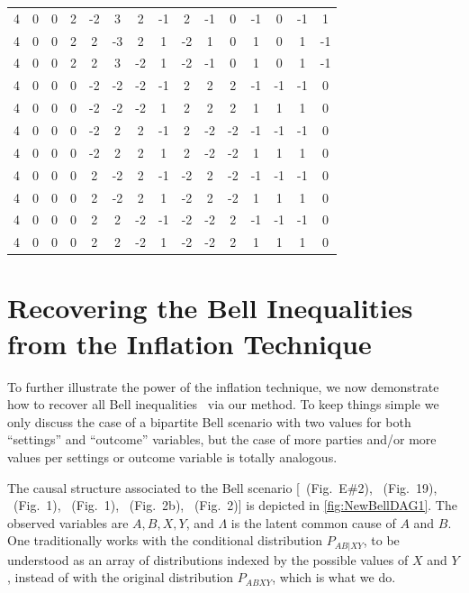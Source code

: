 \documentclass[aps,english,10pt,superscriptaddress,onecolumn,twoside,longbibliography,pra,floatfix,fleqn,nofootinbib]{revtex4-1}
\theoremstyle{definition}
\begin{document}
\begin{table}[hb]
{\begin{tabular}{c@{\hspace{1em}}ccc@{\hspace{1em}}ccc@{\hspace{1em}}c@{\hspace{1em}}ccc@{\hspace{1em}}ccc@{\hspace{1em}}c}
 4 & 0 & 0 & 2 & -2 & 3 & 2 & -1 & 2 & -1 & 0 & -1 & 0 & -1 & 1 \\
 4 & 0 & 0 & 2 & 2 & -3 & 2 & 1 & -2 & 1 & 0 & 1 & 0 & 1 & -1 \\
 4 & 0 & 0 & 2 & 2 & 3 & -2 & 1 & -2 & -1 & 0 & 1 & 0 & 1 & -1 \\
 4 & 0 & 0 & 0 & -2 & -2 & -2 & -1 & 2 & 2 & 2 & -1 & -1 & -1 & 0 \\
 4 & 0 & 0 & 0 & -2 & -2 & -2 & 1 & 2 & 2 & 2 & 1 & 1 & 1 & 0 \\
 4 & 0 & 0 & 0 & -2 & 2 & 2 & -1 & 2 & -2 & -2 & -1 & -1 & -1 & 0 \\
 4 & 0 & 0 & 0 & -2 & 2 & 2 & 1 & 2 & -2 & -2 & 1 & 1 & 1 & 0 \\
 4 & 0 & 0 & 0 & 2 & -2 & 2 & -1 & -2 & 2 & -2 & -1 & -1 & -1 & 0 \\
 4 & 0 & 0 & 0 & 2 & -2 & 2 & 1 & -2 & 2 & -2 & 1 & 1 & 1 & 0 \\
 4 & 0 & 0 & 0 & 2 & 2 & -2 & -1 & -2 & -2 & 2 & -1 & -1 & -1 & 0 \\
 4 & 0 & 0 & 0 & 2 & 2 & -2 & 1 & -2 & -2 & 2 & 1 & 1 & 1 & 0 \\
\end{tabular}}
\end{table}

\section{Recovering the Bell Inequalities from the Inflation Technique}
\label{sec:Bellscenarios}

To further illustrate the power of the inflation technique, we now demonstrate how to recover all Bell inequalities~\cite{Brunner2013Bell,bell1966lhvm,CHSHOriginal} via our method. To keep things simple we only discuss the case of a bipartite Bell scenario with two values for both ``settings'' and ``outcome'' variables, but the case of more parties and/or more values per settings or outcome variable is totally analogous.

The causal structure associated to the Bell \cite{bell1964einstein,Brunner2013Bell,bell1966lhvm,CHSHOriginal} scenario [\citealp{pusey2014gdag}~(Fig.~E\#2), \citealp{WoodSpekkens}~(Fig.~19), \citealp{chaves2014novel}~(Fig.~1), \citealp{BeyondBellII}~(Fig.~1), \citealp{wolfe2015nonconvexity}~(Fig.~2b), \citealp{steeg2011relaxation}~(Fig.~2)] is depicted in \cref{fig:NewBellDAG1}. The observed variables are $A,B,X,Y$, and $\Lambda$ is the latent common cause of $A$ and $B$. One traditionally works with the conditional distribution $P_{AB|XY}$, to be understood as an array of distributions indexed by the possible values of $X$ and $Y$, instead of with the original distribution $P_{ABXY}$, which is what we do.
\end{document}

